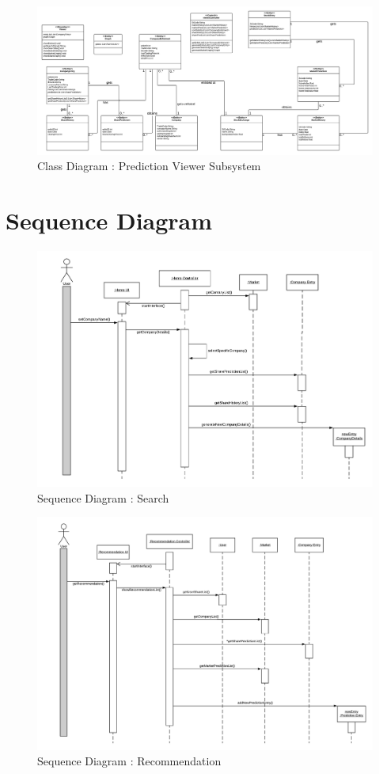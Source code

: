 \documentclass{article}[12pt]
\begin{document}
    \begin{figure}[!h]
        \centering
        \includegraphics[width=.9\textwidth]{Images/ClassDiagram_Viewer.png}
        \caption{Class Diagram : Prediction Viewer Subsystem}
    \end{figure}



\newpage
\section{Sequence Diagram}

    \begin{figure}[!h]
        \centering
        \includegraphics[width=.9\textwidth]{Images/SD_Search.png}
        \caption{Sequence Diagram : Search}
    \end{figure}

    \begin{figure}[!h]
        \centering
        \includegraphics[width=.9\textwidth]{Images/SD_Recommendation.png}
        \caption{Sequence Diagram : Recommendation}
    \end{figure}
\end{document}
